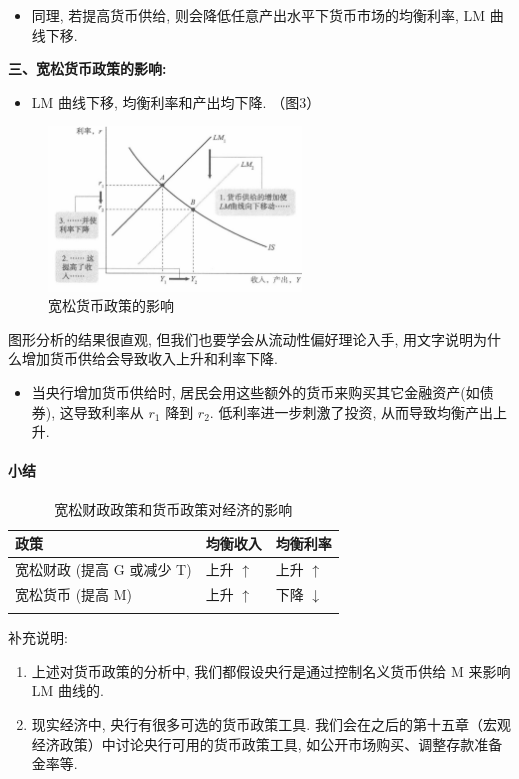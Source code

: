 \documentclass[]{ctexart}
\begin{document}
\begin{itemize}
\item
  同理,  若提高货币供给, 则会降低任意产出水平下货币市场的均衡利率,  LM 曲线下移. 
\end{itemize}

\textbf{三、宽松货币政策的影响:} 

\begin{itemize}
\item
  LM 曲线下移,  均衡利率和产出均下降. （图3）
\end{itemize}

\begin{figure}
\centering
\includegraphics[width=0.6\textwidth]{fig2/lm-2.jpeg}
\caption{宽松货币政策的影响}
\end{figure}

图形分析的结果很直观,  但我们也要学会从流动性偏好理论入手,  用文字说明为什么增加货币供给会导致收入上升和利率下降. 

\begin{itemize}
\item
  当央行增加货币供给时, 居民会用这些额外的货币来购买其它金融资产(如债券), 这导致利率从
  \(r_1\) 降到 \(r_2\). 
  低利率进一步刺激了投资,  从而导致均衡产出上升. 
\end{itemize}


\paragraph{小结}
  \begin{longtable}[]{@{}lll@{}}
\toprule
政策 & 均衡收入 & 均衡利率\tabularnewline
\midrule
\endhead
宽松财政 (提高 G 或减少 T) & 上升 $\uparrow$ & 上升 $\uparrow$ \tabularnewline
宽松货币 (提高 M) & 上升 $\uparrow$ & 下降 $\downarrow$  \tabularnewline
\bottomrule
\caption{宽松财政政策和货币政策对经济的影响}
\end{longtable}

补充说明: 
\begin{enumerate}
\item 
  上述对货币政策的分析中,  我们都假设央行是通过控制名义货币供给 M 来影响 LM 曲线的.
\item 
  现实经济中, 央行有很多可选的货币政策工具.
  我们会在之后的第十五章（宏观经济政策）中讨论央行可用的货币政策工具, 如公开市场购买、调整存款准备金率等. 
\end{enumerate}
\end{document}
